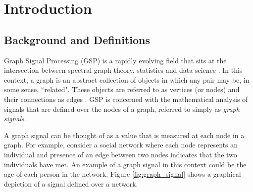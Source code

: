 


\pagestyle{fancy} %


\chapter{Introduction} %

\label{chap:ntroduction} %



\section{Background and Definitions}

Graph Signal Processing (GSP) is a rapidly evolving field that sits at the intersection between spectral graph theory, statistics and data science \citep{Shuman2013}. In this context, a graph is an abstract collection of objects in which any pair may be, in some sense, ``related". These objects are referred to as vertices (or nodes) and their connections as edges \citep{Newman2018}. GSP is concerned with the mathematical analysis of signals that are defined over the nodes of a graph, referred to simply as \textit{graph signals}. 

A graph signal can be thought of as a value that is measured at each node in a graph. For example, consider a social network where each node represents an individual and presence of an edge between two nodes indicates that the two individuals have met. An example of a graph signal in this context could be the age of each person in the network. Figure \ref{fig:graph_signal} shows a graphical depiction of a  signal defined over a network. 
  


